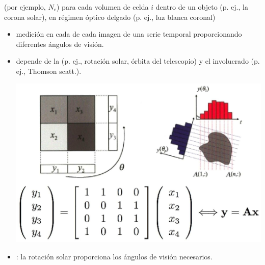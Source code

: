 \documentclass{beamer}
\begin{document}

\begin{frame}
\footnotesize
\vskip 0.1cm
  (por ejemplo, $N_e$) para cada volumen de celda $i$ dentro de un objeto (p. ej., la corona solar), en régimen óptico delgado (p. ej., luz blanca coronal)

\vskip 0.1cm
\begin{itemize} 
\item {} medición en cada  de cada imagen de una serie temporal proporcionando diferentes ángulos de visión.\\


\item {} depende de la  (p. ej., rotación solar, órbita del telescopio) y el  involucrado (p. ej., Thomson scatt.).

\begin{center}
{\includegraphics[width=0.55\linewidth]{figuras/tom_sketch.eps}}
\end{center}
\item {}: la rotación solar proporciona los ángulos de visión necesarios.
\end{itemize}
\end{frame}
\end{document}
